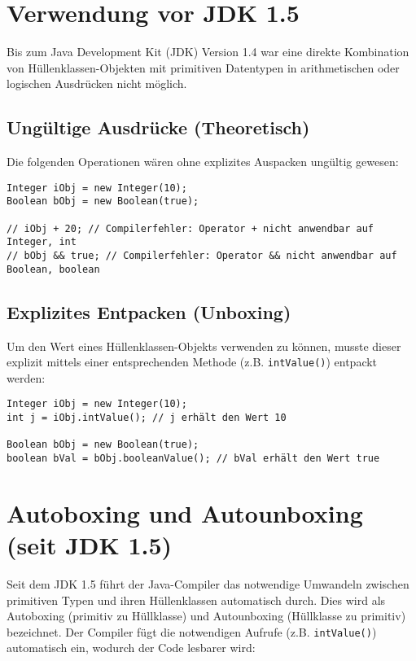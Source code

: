\section{Verwendung vor JDK 1.5}
\label{sec:verwendung_vor_jdk1_5}
Bis zum Java Development Kit (JDK) Version 1.4 war eine direkte Kombination von Hüllenklassen-Objekten mit primitiven Datentypen in arithmetischen oder logischen Ausdrücken nicht möglich.

\subsection{Ungültige Ausdrücke (Theoretisch)}
\label{ssec:ungueltige_ausdruecke_vor_jdk1_5}
Die folgenden Operationen wären ohne explizites Auspacken ungültig gewesen:
\begin{lstlisting}[caption={Theoretisch ungültige Ausdrücke vor JDK 1.5}]
Integer iObj = new Integer(10);
Boolean bObj = new Boolean(true);

// iObj + 20; // Compilerfehler: Operator + nicht anwendbar auf Integer, int
// bObj && true; // Compilerfehler: Operator && nicht anwendbar auf Boolean, boolean
\end{lstlisting}

\subsection{Explizites Entpacken (Unboxing)}
\label{ssec:explizites_entpacken}
Um den Wert eines Hüllenklassen-Objekts verwenden zu können, musste dieser explizit mittels einer entsprechenden Methode (z.B. \texttt{intValue()}) entpackt werden:
\begin{lstlisting}[caption={Explizites Entpacken des Wertes}]
Integer iObj = new Integer(10);
int j = iObj.intValue(); // j erhält den Wert 10

Boolean bObj = new Boolean(true);
boolean bVal = bObj.booleanValue(); // bVal erhält den Wert true
\end{lstlisting}

\section{Autoboxing und Autounboxing (seit JDK 1.5)}
\label{sec:autoboxing_autounboxing}
Seit dem JDK 1.5 führt der Java-Compiler das notwendige Umwandeln zwischen primitiven Typen und ihren Hüllenklassen automatisch durch. Dies wird als Autoboxing (primitiv zu Hüllklasse) und Autounboxing (Hüllklasse zu primitiv) bezeichnet.
Der Compiler fügt die notwendigen Aufrufe (z.B. \texttt{intValue()}) automatisch ein, wodurch der Code lesbarer wird:

